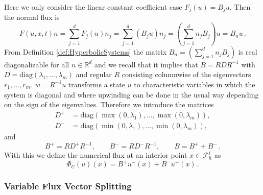 \documentclass[a4paper,12pt]{article}
\theoremstyle{definition}
\theoremstyle{definition}
\newcommand{\Dim}{d}
\begin{document}
Here we only consider the linear constant coefficient case $F_j(u) = B_j u$. Then the normal flux is
\begin{equation}
F(u,x,t)n = \sum_{j=1}^{\Dim} F_j(u) n_j = \sum_{j=1}^{\Dim} (B_j u) n_j
=\left( \sum_{j=1}^{\Dim} n_j B_j\right) u = B_n u \, .
\end{equation}
From Definition \ref{def:HyperbolicSystems} the matrix $B_n = \left( \sum_{j=1}^{\Dim} n_j B_j\right)$
is real diagonalizable for all $n\in\mathbb{R}^{\Dim}$ and we recall
that it implies that $B=RDR^{-1}$ with $D=\text{diag}(\lambda_1,\ldots,\lambda_m)$
and regular $R$ consisting columnwise of the eigenvectors $r_1,\ldots,r_m$.
$w=R^{-1} u$ transforms a state $u$ to characteristic variables in which the system
is diagonal and where upwinding can be done in the usual way depending on the 
sign of the eigenvalues. Therefore we introduce the matrices
\begin{align*}
D^+&=\text{diag}(\max(0,\lambda_1),\ldots,\max(0,\lambda_m)), \\
D^-&=\text{diag}(\min(0,\lambda_1),\ldots,\min(0,\lambda_m)),
\end{align*} 
and
\begin{equation}
B^+ = RD^+R^{-1}, \qquad B^- = RD^-R^{-1}, \qquad B = B^+ + B^- \, .
\end{equation}
With this we define the numerical flux at an interior point $x\in\mathcal{F}_h^i$ as
\begin{equation}\label{eq:system_upwind}
\Phi_U(u)(x) = B^+ u^-(x) + B^- u^+(x) \, .
\end{equation}


\subsubsection{Variable Flux Vector Splitting}
\end{document}
